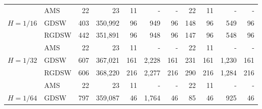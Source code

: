 \begin{table}[H]
\begin{tabular}{llrrrrrrrrr}
\cline{2-11}
\bfseries  & AMS & 22 & {\cellcolor[HTML]{BCE395}} \color[HTML]{000000} 23 & 11 & {\cellcolor[HTML]{004529}} \color[HTML]{F1F1F1} {\cellcolor[HTML]{ADD8E6}} - & - & {\cellcolor[HTML]{379E54}} \color[HTML]{F1F1F1} 22 & 11 & {\cellcolor[HTML]{FFFFE5}} \color[HTML]{000000} {\cellcolor[HTML]{ADD8E6}} - & - \\
\cline{1-11} \cline{2-11}
\multirow[c]{3}{*}{\bfseries $H=1/16$} & GDSW & 403 & {\cellcolor[HTML]{FFFFE5}} \color[HTML]{000000} 350,992 & 96 & {\cellcolor[HTML]{BCE395}} \color[HTML]{000000} 949 & 96 & {\cellcolor[HTML]{379E54}} \color[HTML]{F1F1F1} 148 & 96 & {\cellcolor[HTML]{004529}} \color[HTML]{F1F1F1} 549 & 96 \\
\cline{2-11}
\bfseries  & RGDSW & 442 & {\cellcolor[HTML]{FFFFE5}} \color[HTML]{000000} 351,891 & 96 & {\cellcolor[HTML]{BCE395}} \color[HTML]{000000} 948 & 96 & {\cellcolor[HTML]{379E54}} \color[HTML]{F1F1F1} 147 & 96 & {\cellcolor[HTML]{004529}} \color[HTML]{F1F1F1} 548 & 96 \\
\cline{2-11}
\bfseries  & AMS & 22 & {\cellcolor[HTML]{BCE395}} \color[HTML]{000000} 23 & 11 & {\cellcolor[HTML]{004529}} \color[HTML]{F1F1F1} {\cellcolor[HTML]{ADD8E6}} - & - & {\cellcolor[HTML]{379E54}} \color[HTML]{F1F1F1} 22 & 11 & {\cellcolor[HTML]{FFFFE5}} \color[HTML]{000000} {\cellcolor[HTML]{ADD8E6}} - & - \\
\cline{1-11} \cline{2-11}
\multirow[c]{3}{*}{\bfseries $H=1/32$} & GDSW & 607 & {\cellcolor[HTML]{BCE395}} \color[HTML]{000000} 367,021 & 161 & {\cellcolor[HTML]{FFFFE5}} \color[HTML]{000000} 2,228 & 161 & {\cellcolor[HTML]{379E54}} \color[HTML]{F1F1F1} 231 & 161 & {\cellcolor[HTML]{004529}} \color[HTML]{F1F1F1} 1,230 & 161 \\
\cline{2-11}
\bfseries  & RGDSW & 606 & {\cellcolor[HTML]{BCE395}} \color[HTML]{000000} 368,220 & 216 & {\cellcolor[HTML]{FFFFE5}} \color[HTML]{000000} 2,277 & 216 & {\cellcolor[HTML]{379E54}} \color[HTML]{F1F1F1} 290 & 216 & {\cellcolor[HTML]{004529}} \color[HTML]{F1F1F1} 1,284 & 216 \\
\cline{2-11}
\bfseries  & AMS & 22 & {\cellcolor[HTML]{BCE395}} \color[HTML]{000000} 23 & 11 & {\cellcolor[HTML]{004529}} \color[HTML]{F1F1F1} {\cellcolor[HTML]{ADD8E6}} - & - & {\cellcolor[HTML]{379E54}} \color[HTML]{F1F1F1} 22 & 11 & {\cellcolor[HTML]{FFFFE5}} \color[HTML]{000000} {\cellcolor[HTML]{ADD8E6}} - & - \\
\cline{1-11} \cline{2-11}
\multirow[c]{3}{*}{\bfseries $H=1/64$} & GDSW & 797 & {\cellcolor[HTML]{FFFFE5}} \color[HTML]{000000} 359,087 & 46 & {\cellcolor[HTML]{BCE395}} \color[HTML]{000000} 1,764 & 46 & {\cellcolor[HTML]{379E54}} \color[HTML]{F1F1F1} 85 & 46 & {\cellcolor[HTML]{004529}} \color[HTML]{F1F1F1} 925 & 46 \\

\end{tabular}
\end{table}
